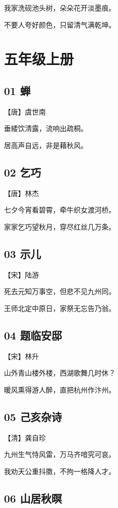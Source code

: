 \documentclass[12pt]{article}
\begin{document}
我家洗砚池头树，朵朵花开淡墨痕。

不要人夸好颜色，只留清气满乾坤。

\newpage

\section*{五年级上册}

\subsection*{01 蝉}

【唐】虞世南

垂緌饮清露，流响出疏桐。

居高声自远，非是藉秋风。

\subsection*{02 乞巧}


【唐】林杰

七夕今宵看碧霄，牵牛织女渡河桥。

家家乞巧望秋月，穿尽红丝几万条。

\subsection*{03 示儿}

【宋】陆游

死去元知万事空，但悲不见九州同。

王师北定中原日，家祭无忘告乃翁。

\subsection*{04 题临安邸}

【宋】林升

山外青山楼外楼，西湖歌舞几时休？

暖风熏得游人醉，直把杭州作汴州。

\subsection*{05 己亥杂诗}

【清】龚自珍

九州生气恃风雷，万马齐喑究可哀。

我劝天公重抖擞，不拘一格降人才。

\subsection*{06 山居秋暝}
\end{document}
